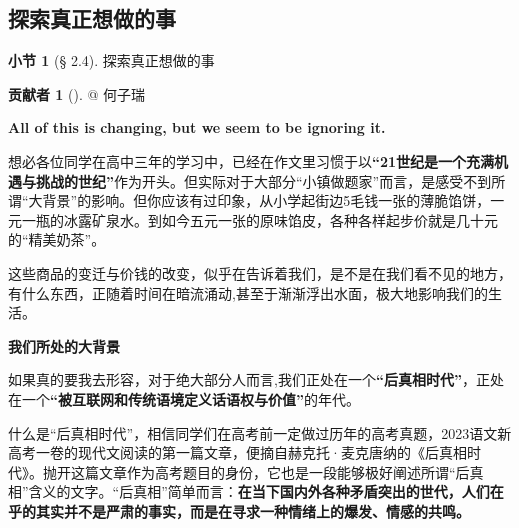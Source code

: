 \documentclass{beamer}	%
\theoremstyle{plain}
\theoremstyle{definition}
\newtheorem{ex}{贡献者}[section]
\newtheorem{dfn}{小节}[section]
\theoremstyle{remark}
\numberwithin{equation}{section}
\begin{document}
\subsection{探索真正想做的事}

\begin{frame}
	\begin{dfn}[§ 2.4]
		探索真正想做的事
	\end{dfn}

	\begin{ex}[]
		@ 何子瑞
	\end{ex}
\end{frame}

\begin{frame}
	\begin{LARGE}
		\textbf{All of this is changing, but we seem to be ignoring it.}
	\end{LARGE}
	\vspace{1cm}

	想必各位同学在高中三年的学习中，已经在作文里习惯于以\textbf{“21世纪是一个充满机遇与挑战的世纪”}作为开头。但实际对于大部分“小镇做题家”而言，是感受不到所谓“大背景”的影响。但你应该有过印象，从小学起街边5毛钱一张的薄脆馅饼，一元一瓶的冰露矿泉水。到如今五元一张的原味馅皮，各种各样起步价就是几十元的“精美奶茶”。
	\vspace{0.5cm}

	这些商品的变迁与价钱的改变，似乎在告诉着我们，是不是在我们看不见的地方，有什么东西，正随着时间在暗流涌动,甚至于渐渐浮出水面，极大地影响我们的生活。
\end{frame}

\begin{frame}
	\begin{LARGE}
		\textbf{我们所处的大背景}
	\end{LARGE}
	\vspace{1cm}

	如果真的要我去形容，对于绝大部分人而言,我们正处在一个\textbf{“后真相时代”}，正处在一个\textbf{“被互联网和传统语境定义话语权与价值”}的年代。
	\vspace{0.5cm}

	什么是“后真相时代”，相信同学们在高考前一定做过历年的高考真题，2023语文新高考一卷的现代文阅读的第一篇文章，便摘自赫克托·麦克唐纳的《后真相时代》。抛开这篇文章作为高考题目的身份，它也是一段能够极好阐述所谓“后真相”含义的文字。“后真相”简单而言：\textbf{在当下国内外各种矛盾突出的世代，人们在乎的其实并不是严肃的事实，而是在寻求一种情绪上的爆发、情感的共鸣。}
\end{frame}
\end{document}
